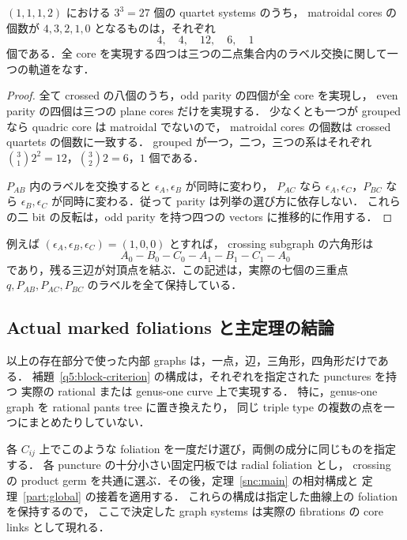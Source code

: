 \begin{corollary}
\label{q5:four-systems}
$(1,1,1,2)$ における $3^3=27$ 個の quartet systems のうち，
matroidal cores の個数が $4,3,2,1,0$ となるものは，それぞれ
\[
 4,\quad4,\quad12,\quad6,\quad1
\]
個である．全 core を実現する四つは三つの二点集合内のラベル交換に関して一つの軌道をなす．
\end{corollary}

\begin{proof}
全て crossed の八個のうち，odd parity の四個が全 core を実現し，
even parity の四個は三つの plane cores だけを実現する．
少なくとも一つが grouped なら quadric core は matroidal でないので，
matroidal cores の個数は crossed quartets の個数に一致する．
grouped が一つ，二つ，三つの系はそれぞれ
$\binom31 2^2=12$，$\binom32 2=6$，$1$ 個である．

$P_{AB}$ 内のラベルを交換すると $\epsilon_A,\epsilon_B$ が同時に変わり，
$P_{AC}$ なら $\epsilon_A,\epsilon_C$，$P_{BC}$ なら
$\epsilon_B,\epsilon_C$ が同時に変わる．従って parity は列挙の選び方に依存しない．
これらの二 bit の反転は，odd parity を持つ四つの vectors に推移的に作用する．
\end{proof}

例えば $(\epsilon_A,\epsilon_B,\epsilon_C)=(1,0,0)$ とすれば，
crossing subgraph の六角形は
\[
 A_0-B_0-C_0-A_1-B_1-C_1-A_0
\]
であり，残る三辺が対頂点を結ぶ．この記述は，実際の七個の三重点
$q,P_{AB},P_{AC},P_{BC}$ のラベルを全て保持している．

\subsection{Actual marked foliations と主定理の結論}

以上の存在部分で使った内部 graphs は，一点，辺，三角形，四角形だけである．
補題~\ref{q5:block-criterion} の構成は，それぞれを指定された punctures を持つ
実際の rational または genus-one curve 上で実現する．
特に，genus-one graph を rational pants tree に置き換えたり，
同じ triple type の複数の点を一つにまとめたりしていない．

各 $C_{ij}$ 上でこのような foliation を一度だけ選び，両側の成分に同じものを指定する．
各 puncture の十分小さい固定円板では radial foliation とし，
crossing の product germ を共通に選ぶ．その後，定理~\ref{snc:main} の相対構成と
定理~\ref{part:global} の接着を適用する．
これらの構成は指定した曲線上の foliation を保持するので，
ここで決定した graph systems は実際の fibrations の core links として現れる．

